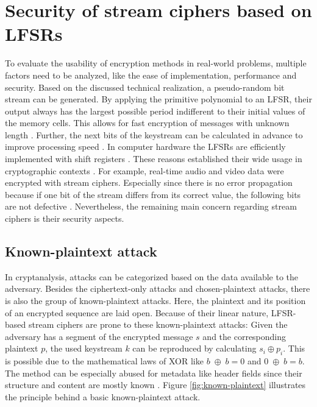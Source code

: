 \section{Security of stream ciphers based on LFSRs}

To evaluate the usability of encryption methods in real-world problems, multiple factors need to be analyzed, like the ease of implementation, performance and security. Based on the discussed technical realization, a pseudo-random bit stream can be generated. By applying the primitive polynomial to an LFSR, their output always has the largest possible period indifferent to their initial values of the memory cells. This allows for fast encryption of messages with unknown length \cite[p. 181]{Smart.2016}. Further, the next bits of the keystream can be calculated in advance to improve processing speed \cite[p. 3]{Robshaw.1995}. In computer hardware the LFSRs are efficiently implemented with shift registers \cite{Stamp.2007}. These reasons established their wide usage in cryptographic contexts \cite[p. 97]{Pommerening.2000}. For example, real-time audio and video data were encrypted with stream ciphers. Especially since there is no error propagation because if one bit of the stream differs from its correct value, the following bits are not defective \cite[p. 181]{Smart.2016}. Nevertheless, the remaining main concern regarding stream ciphers is their security aspects. 

\pagebreak

\subsection{Known-plaintext attack}

In cryptanalysis, attacks can be categorized based on the data available to the adversary. Besides the ciphertext-only attacks and chosen-plaintext attacks, there is also the group of known-plaintext attacks. Here, the plaintext and its position of an encrypted sequence are laid open. Because of their linear nature, LFSR-based stream ciphers are prone to these known-plaintext attacks: Given the adversary has a segment of the encrypted message $s$ and the corresponding plaintext $p$, the used keystream $k$ can be reproduced by calculating $s_i \oplus p_i$. This is possible due to the mathematical laws of XOR like $b\;\oplus\;b = 0$ \space and \space $0\;\oplus\;b = b$. The method can be especially abused for metadata like header fields since their structure and content are mostly known \cite[p. 359]{Eckert.2018}. Figure \ref{fig:known-plaintext} illustrates the principle behind a basic known-plaintext attack. \\


